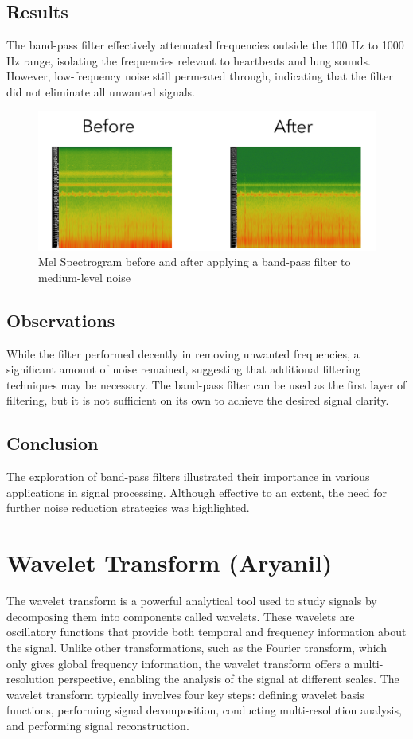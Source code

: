\documentclass[conference]{IEEEtran}
\begin{document}
\subsection{Results}
The band-pass filter effectively attenuated frequencies outside the 100 Hz to 1000 Hz range, isolating the frequencies relevant to heartbeats and lung sounds. However, low-frequency noise still permeated through, indicating that the filter did not eliminate all unwanted signals.

\begin{figure}[h]
    \centering
    \includegraphics[width=1\linewidth]{Images/medium_obs.png}
    \caption{Mel Spectrogram before and after applying a band-pass filter to medium-level noise}
    \label{fig:enter-label}
\end{figure}

\subsection{Observations}
While the filter performed decently in removing unwanted frequencies, a significant amount of noise remained, suggesting that additional filtering techniques may be necessary. The band-pass filter can be used as the first layer of filtering, but it is not sufficient on its own to achieve the desired signal clarity.


\subsection{Conclusion}
The exploration of band-pass filters illustrated their importance in various applications in signal processing. Although effective to an extent, the need for further noise reduction strategies was highlighted.




\section{Wavelet Transform (Aryanil)} The wavelet transform is a powerful analytical tool used to study signals by decomposing them into components called wavelets. These wavelets are oscillatory functions that provide both temporal and frequency information about the signal. Unlike other transformations, such as the Fourier transform, which only gives global frequency information, the wavelet transform offers a multi-resolution perspective, enabling the analysis of the signal at different scales. The wavelet transform typically involves four key steps: defining wavelet basis functions, performing signal decomposition, conducting multi-resolution analysis, and performing signal reconstruction.
\end{document}
